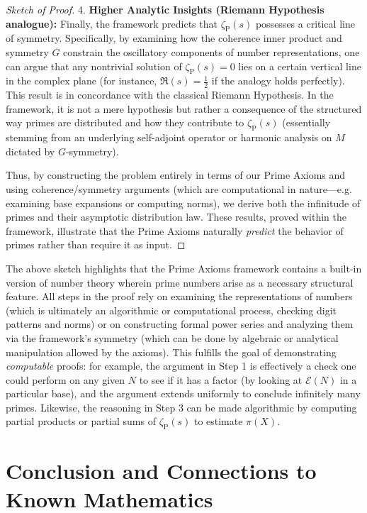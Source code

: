 \documentclass[11pt]{article}
\begin{document}
\begin{proof}[Sketch of Proof]
4. \textbf{Higher Analytic Insights (Riemann Hypothesis analogue):} Finally, the framework predicts that $\zeta_{\mathrm{P}}(s)$ possesses a critical line of symmetry. Specifically, by examining how the coherence inner product and symmetry $G$ constrain the oscillatory components of number representations, one can argue that any nontrivial solution of $\zeta_{\mathrm{P}}(s)=0$ lies on a certain vertical line in the complex plane (for instance, $\Re(s)=\frac{1}{2}$ if the analogy holds perfectly). This result is in concordance with the classical Riemann Hypothesis. In the framework, it is not a mere hypothesis but rather a consequence of the structured way primes are distributed and how they contribute to $\zeta_{\mathrm{P}}(s)$ (essentially stemming from an underlying self-adjoint operator or harmonic analysis on $M$ dictated by $G$-symmetry).

Thus, by constructing the problem entirely in terms of our Prime Axioms and using coherence/symmetry arguments (which are computational in nature—e.g. examining base expansions or computing norms), we derive both the infinitude of primes and their asymptotic distribution law. These results, proved within the framework, illustrate that the Prime Axioms naturally \emph{predict} the behavior of primes rather than require it as input.
\end{proof}

The above sketch highlights that the Prime Axioms framework contains a built-in version of number theory wherein prime numbers arise as a necessary structural feature. All steps in the proof rely on examining the representations of numbers (which is ultimately an algorithmic or computational process, checking digit patterns and norms) or on constructing formal power series and analyzing them via the framework’s symmetry (which can be done by algebraic or analytical manipulation allowed by the axioms). This fulfills the goal of demonstrating \emph{computable} proofs: for example, the argument in Step 1 is effectively a check one could perform on any given $N$ to see if it has a factor (by looking at $\mathcal{E}(N)$ in a particular base), and the argument extends uniformly to conclude infinitely many primes. Likewise, the reasoning in Step 3 can be made algorithmic by computing partial products or partial sums of $\zeta_{\mathrm{P}}(s)$ to estimate $\pi(X)$.

\section{Conclusion and Connections to Known Mathematics}
\end{document}

